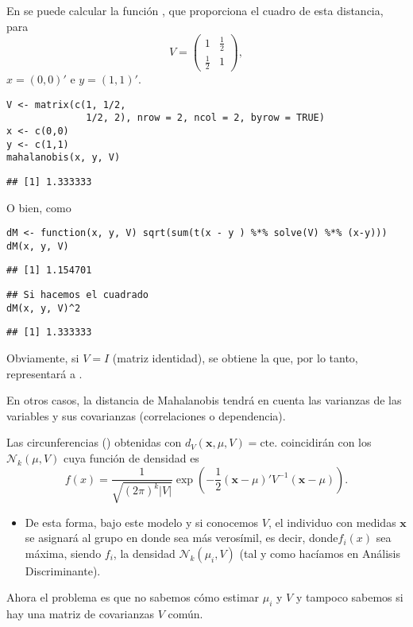 En  se puede calcular la función , que proporciona el cuadro de esta distancia, para \[ V=\begin{pmatrix}
1 & \tfrac{1}{2}\\
\tfrac{1}{2} & 1
\end{pmatrix}, \]$x=(0,0)'$ e $y=(1,1)'$.
\begin{lstlisting}
V <- matrix(c(1, 1/2,
              1/2, 2), nrow = 2, ncol = 2, byrow = TRUE)
x <- c(0,0)
y <- c(1,1)
mahalanobis(x, y, V)
\end{lstlisting}
\begin{verbatim}
## [1] 1.333333
\end{verbatim}
O bien, como 
\begin{lstlisting}
dM <- function(x, y, V) sqrt(sum(t(x - y ) %*% solve(V) %*% (x-y)))
dM(x, y, V)
\end{lstlisting}
\begin{verbatim}
## [1] 1.154701
\end{verbatim}
\begin{lstlisting}
## Si hacemos el cuadrado
dM(x, y, V)^2
\end{lstlisting}
\begin{verbatim}
## [1] 1.333333
\end{verbatim}
Obviamente, si $V=I$ (matriz identidad), se obtiene la  que, por lo tanto, representará a .

En otros casos, la distancia de Mahalanobis tendrá en cuenta las varianzas de las variables y sus covarianzas (correlaciones o dependencia).

Las circunferencias () obtenidas con $d_V(\mathbf{x},\mu,V)=\mathrm{cte}.$ coincidirán con los  $\mathcal{N}_k(\mu,V)$ cuya función de densidad es \[ f(x)=\dfrac{1}{\sqrt{(2\pi)^k|V|}}\exp\left(-\dfrac{1}{2}(\mathbf{x}-\mu)'V^{-1}(\mathbf{x}-\mu)\right). \]
\begin{itemize}
\item De esta forma, bajo este modelo y si conocemos $V$, el individuo con medidas $\mathbf{x}$ se asignará al grupo en donde sea más verosímil, es decir, donde$f_i(x)$ sea máxima, siendo $f_i$, la densidad $\mathcal{N}_k(\mu_i, V)$ (tal y como hacíamos en Análisis Discriminante).
\end{itemize}
Ahora el problema es que no sabemos cómo estimar $\mu_i$ y $V$ y tampoco sabemos si hay una matriz de covarianzas $V$ común.